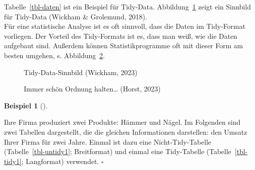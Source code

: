 \documentclass[
  letterpaper,
  oneside,
  open=any]{scrbook}
\theoremstyle{definition}
\theoremstyle{definition}
\newtheorem{example}{Beispiel}[chapter]
\theoremstyle{definition}
\theoremstyle{remark}
\begin{document}
Tabelle~\ref{tbl-daten} ist ein Beispiel für Tidy-Data.
Abbildung~\ref{fig-tidy1} zeigt ein Sinnbild für Tidy-Data (Wickham \&
Grolemund, 2018).\\
Für eine statistische Analyse ist es oft sinnvoll, dass die Daten im
Tidy-Format vorliegen. Der Vorteil des Tidy-Formats ist es, dass man
weiß, wie die Daten aufgebaut sind. Außerdem können Statistikprogramme
oft mit dieser Form am besten umgehen, s. Abbildung~\ref{fig-tidy3}.

\begin{figure}


\caption{\label{fig-tidy1}Tidy-Data-Sinnbild (Wickham, 2023)}

\end{figure}%

\begin{figure}


\caption{\label{fig-tidy3}Immer schön Ordnung halten\ldots{} (Horst,
2023)}

\end{figure}%

\begin{example}[]\protect\hypertarget{exm-widelong}{}\label{exm-widelong}

Ihre Firma produziert zwei Produkte: Hämmer und Nägel. Im Folgenden sind
zwei Tabellen dargestellt, die die gleichen Informationen darstellen:
den Umsatz Ihrer Firma für zwei Jahre. Einmal ist dazu eine
Nicht-Tidy-Tabelle (Tabelle~\ref{tbl-untidy1}; Breitformat) und einmal
eine Tidy-Tabelle (Tabelle~\ref{tbl-tidy1}; Langformat) verwendet.
\(\square\)

\end{example}
\end{document}
